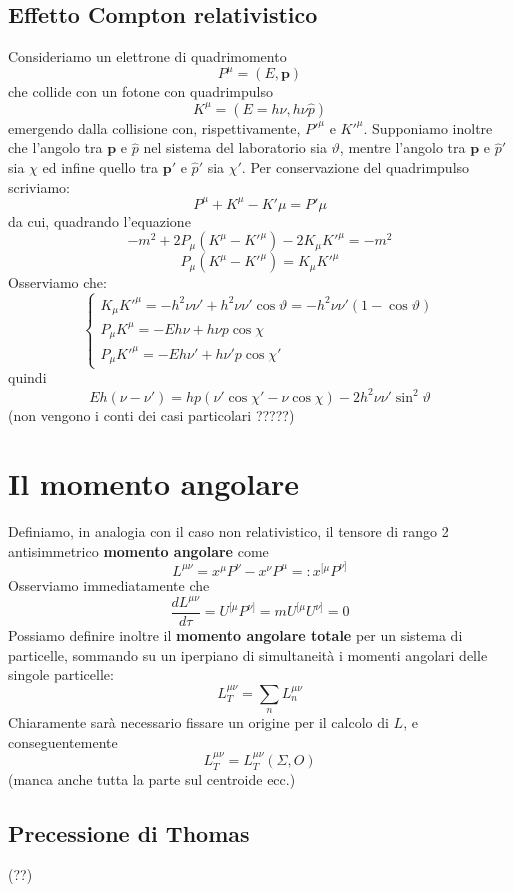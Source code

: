 \documentclass[a4paper,11pt]{book}
\theoremstyle{plain}
\theoremstyle{definition}
\begin{document}
\subsection{Effetto Compton relativistico}
Consideriamo un elettrone di quadrimomento 
\[
P^{\mu} = (E,\textbf{p})
\]
che collide con un fotone con quadrimpulso
\[
K^{\mu}=(E=h\nu, h\nu\hat{p})
\]
emergendo dalla collisione con, rispettivamente, $P'^{\mu}$ e $K'^{\mu}$. Supponiamo inoltre che l'angolo tra $\textbf{p}$ e $\hat{p}$ nel sistema del laboratorio sia $\vartheta$, mentre l'angolo tra $\textbf{p}$ e $\hat{p}'$ sia $\chi$ ed infine quello tra $\textbf{p}'$ e $\hat{p}'$ sia $\chi'$. Per conservazione del quadrimpulso scriviamo:
\[
P^{\mu}+K^{\mu}-K'{\mu}=P'{\mu}
\]
da cui, quadrando l'equazione
\[
-m^2+2P_{\mu}(K^{\mu}-K'^{\mu})-2K_{\mu}K'^{\mu}=-m^2
\]
\[
P_{\mu}(K^{\mu}-K'^{\mu})=K_{\mu}K'^{\mu}
\]
Osserviamo che:
\[
\begin{cases}
K_{\mu}K'^{\mu}=-h^2\nu\nu'+h^2\nu\nu'\cos\vartheta=-h^2\nu\nu'(1-\cos\vartheta) \\
P_{\mu}K^{\mu} = -Eh\nu+h\nu p\cos\chi \\
P_{\mu}K'^{\mu} = -Eh\nu' + h\nu'p\cos\chi'
\end{cases}
\]
quindi
\[
Eh(\nu-\nu')=hp(\nu'\cos\chi'-\nu\cos\chi)-2h^2\nu\nu'\sin^2\vartheta
\]
(non vengono i conti dei casi particolari ?????)
\section{Il momento angolare}
Definiamo, in analogia con il caso non relativistico, il tensore di rango 2 antisimmetrico \textbf{momento angolare} come
\[
L^{\mu\nu}=x^{\mu}P^{\nu}-x^{\nu}P^{\mu}=: x^{[\mu}P^{\nu]}
\]
Osserviamo immediatamente che
\[
\frac{dL^{\mu\nu}}{d\tau}=U^{[\mu}P^{\nu]}=mU^{[\mu}U^{\nu]}=0
\]
Possiamo definire inoltre il \textbf{momento angolare totale} per un sistema di particelle, sommando su un iperpiano di simultaneità i momenti angolari delle singole particelle:
\[
L_T^{\mu\nu}=\sum_n L_n^{\mu\nu}
\]
Chiaramente sarà necessario fissare un origine per il calcolo di $L$, e conseguentemente
\[
L^{\mu\nu}_T=L^{\mu\nu}_T(\Sigma,O)
\]
(manca anche tutta la parte sul centroide ecc.)
\subsection{Precessione di Thomas}
(??)
\end{document}
